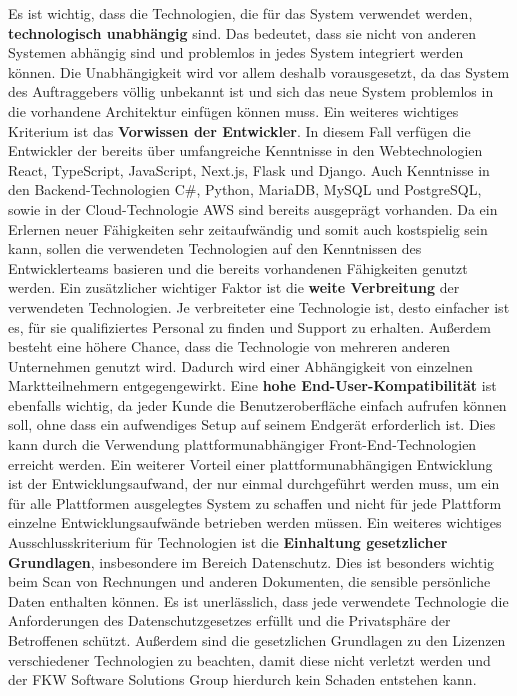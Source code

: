Es ist wichtig, dass die Technologien, die für das System verwendet werden, \textbf{technologisch unabhängig} sind. 
Das bedeutet, dass sie nicht von anderen Systemen abhängig sind und problemlos in jedes System integriert werden können. 
Die Unabhängigkeit wird vor allem deshalb vorausgesetzt, da das System des Auftraggebers völlig unbekannt ist und sich das neue System problemlos in die vorhandene Architektur einfügen können muss.
\newparagraph
Ein weiteres wichtiges Kriterium ist das \textbf{Vorwissen der Entwickler}. 
In diesem Fall verfügen die Entwickler der \vFKW bereits über umfangreiche Kenntnisse in den Webtechnologien React, TypeScript, JavaScript, Next.js, Flask und Django. 
Auch Kenntnisse in den Backend-Technologien C\#, Python, MariaDB, MySQL und PostgreSQL, sowie in der Cloud-Technologie \ac{AWS} sind bereits ausgeprägt vorhanden. 
Da ein Erlernen neuer Fähigkeiten sehr zeitaufwändig und somit auch kostspielig sein kann, sollen die verwendeten Technologien auf den Kenntnissen des Entwicklerteams basieren und die bereits vorhandenen Fähigkeiten genutzt werden.
\newparagraph
Ein zusätzlicher wichtiger Faktor ist die \textbf{weite Verbreitung} der verwendeten Technologien. 
Je verbreiteter eine Technologie ist, desto einfacher ist es, für sie qualifiziertes Personal zu finden und Support zu erhalten. 
Außerdem besteht eine höhere Chance, dass die Technologie von mehreren anderen Unternehmen genutzt wird. 
Dadurch wird einer Abhängigkeit von einzelnen Marktteilnehmern entgegengewirkt.
\newparagraph
Eine \textbf{hohe End-User-Kompatibilität} ist ebenfalls wichtig, da jeder Kunde die Benutzeroberfläche einfach aufrufen können soll, ohne dass ein aufwendiges Setup auf seinem Endgerät erforderlich ist. 
Dies kann durch die Verwendung plattformunabhängiger Front-End-Technologien erreicht werden. 
Ein weiterer Vorteil einer plattformunabhängigen Entwicklung ist der Entwicklungsaufwand, der nur einmal durchgeführt werden muss, um ein für alle Plattformen ausgelegtes System zu schaffen und nicht für jede Plattform einzelne Entwicklungsaufwände betrieben werden müssen.
\newparagraph
Ein weiteres wichtiges Ausschlusskriterium für Technologien ist die \textbf{Einhaltung gesetzlicher Grundlagen}, insbesondere im Bereich Datenschutz. 
Dies ist besonders wichtig beim Scan von Rechnungen und anderen Dokumenten, die sensible persönliche Daten enthalten können. 
Es ist unerlässlich, dass jede verwendete Technologie die Anforderungen des Datenschutzgesetzes erfüllt und die Privatsphäre der Betroffenen schützt. 
Außerdem sind die gesetzlichen Grundlagen zu den Lizenzen verschiedener Technologien zu beachten, damit diese nicht verletzt werden und der FKW Software Solutions Group hierdurch kein Schaden entstehen kann.
